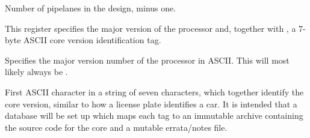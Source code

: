 \reset{****}
Number of pipelanes in the design, minus one.

\implementation{}


This register specifies the major version of the processor and, together with
, a 7-byte ASCII core version identification tag.

Specifies the major version number of the \rvex{} processor in ASCII. This will
most likely always be .

\implementation{}

First ASCII character in a string of seven characters, which together identify 
the core version, similar to how a license plate identifies a car. It is 
intended that a database will be set up which maps each tag to an immutable 
archive containing the source code for the core and a mutable errata/notes file.

\implementation{}

\implementation{}

\implementation{}


